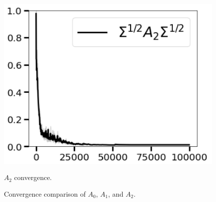 \documentclass[11pt]{article}
\theoremstyle{plain}
\theoremstyle{definition}
\theoremstyle{remark}
\numberwithin{equation}{section}
\begin{document}
\begin{figure}[htbp]
\begin{minipage}[b]{0.32\textwidth}
    \centering
    \includegraphics[width=\textwidth]{Sigma_A2.png}
    \caption{\( A_2 \) convergence.}
    \label{fig:sigma_a2}
  \end{minipage}
  \caption{Convergence comparison of \( A_0 \), \( A_1 \), and \( A_2 \).}
  \label{fig:sigma_comparison}
\end{figure}
\end{document}
